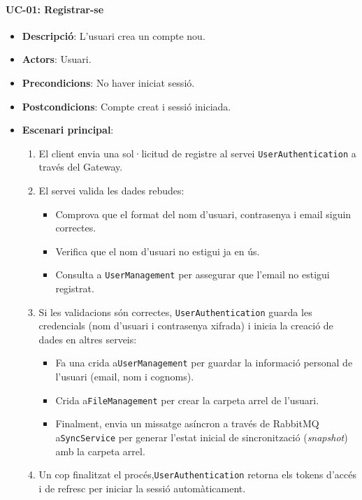 \paragraph{UC-01: Registrar-se}
\begin{itemize}
  \item \textbf{Descripció}: L'usuari crea un compte nou.
  \item \textbf{Actors}: Usuari.
  \item \textbf{Precondicions}: No haver iniciat sessió.
  \item \textbf{Postcondicions}: Compte creat i sessió iniciada.
  \item \textbf{Escenari principal}:
    \begin{enumerate}
        \item El client envia una sol·licitud de registre al servei \texttt{UserAuthentication} a través del Gateway.
        \item El servei valida les dades rebudes:
            \begin{itemize}
                \item Comprova que el format del nom d'usuari, contrasenya i email siguin correctes.
                \item Verifica que el nom d'usuari no estigui ja en ús.
                \item Consulta a \texttt{UserManagement} per assegurar que l'email no estigui registrat.
            \end{itemize}
        \item Si les validacions són correctes, \texttt{UserAuthentication} guarda les credencials (nom d'usuari i contrasenya xifrada) i inicia la creació de dades en altres serveis:
            \begin{itemize}
                \item Fa una crida a\texttt{UserManagement} per guardar la informació personal de l'usuari (email, nom i cognoms).
                \item Crida a\texttt{FileManagement} per crear la carpeta arrel de l'usuari.
                \item Finalment, envia un missatge asíncron a través de RabbitMQ a\texttt{SyncService} per generar l'estat inicial de sincronització (\emph{snapshot}) amb la carpeta arrel.
            \end{itemize}
        \item Un cop finalitzat el procés,\texttt{UserAuthentication} retorna els tokens d'accés i de refresc per iniciar la sessió automàticament.
    \end{enumerate}
\end{itemize}

